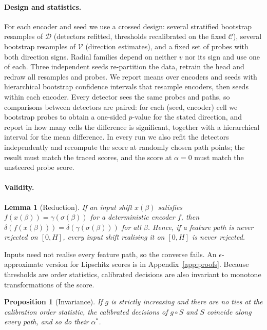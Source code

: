 \documentclass[twoside]{article}
\newtheorem{proposition}{Proposition}
\newtheorem{lemma}{Lemma}
\theoremstyle{definition}
\theoremstyle{remark}
\begin{document}
\paragraph{Design and statistics.}
For each encoder and seed we use a crossed design: several stratified bootstrap resamples of $\mathcal{D}$
(detectors refitted, thresholds recalibrated on the fixed $\mathcal{C}$), several bootstrap resamples of
$\mathcal{V}$ (direction estimates), and a fixed set of probes with both direction signs. Radial families
depend on neither $v$ nor its sign and use one of each. Three independent seeds re-partition the data,
retrain the head and redraw all resamples and probes. We report means over encoders and seeds with
hierarchical bootstrap confidence intervals that resample encoders, then seeds within each encoder. Every
detector sees the same probes and paths, so comparisons between detectors are paired: for each
(seed, encoder) cell we bootstrap probes to obtain a one-sided $p$-value for the stated direction, and
report in how many cells the difference is significant, together with a hierarchical interval for the mean
difference. In every run we also refit the detectors independently and recompute the score at randomly
chosen path points; the result must match the traced scores, and the score at $\alpha=0$ must match the
unsteered probe score.

\paragraph{Validity.}
\begin{lemma}[Reduction]\label{lem:reduction}
If an input shift $x(\beta)$ satisfies $f(x(\beta))=\gamma(\sigma(\beta))$ for a deterministic encoder $f$,
then $\delta(f(x(\beta)))=\delta(\gamma(\sigma(\beta)))$ for all $\beta$. Hence, if a feature path is never
rejected on $[0,H]$, every input shift realising it on $[0,H]$ is never rejected.
\end{lemma}

Inputs need not realise every feature path, so the converse fails. An $\epsilon$-approximate version for
Lipschitz scores is in Appendix~\ref{app:proofs}. Because thresholds are order statistics, calibrated
decisions are also invariant to monotone transformations of the score.

\begin{proposition}[Invariance]\label{prop:invariance}
If $g$ is strictly increasing and there are no ties at the calibration order statistic, the calibrated
decisions of $g\circ S$ and $S$ coincide along every path, and so do their $\alpha^*$.
\end{proposition}
\end{document}
